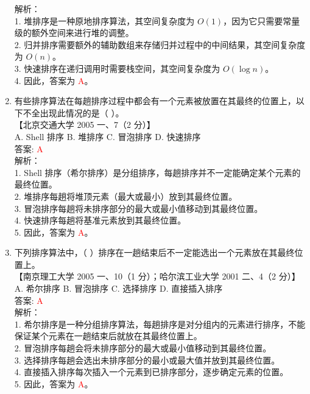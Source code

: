 \documentclass[lang=cn,newtx,10pt,scheme=chinese]{../../../elegantbook}
\begin{document}
\begin{enumerate}
    解析：\\
    1. 堆排序是一种原地排序算法，其空间复杂度为 $O(1)$，因为它只需要常量级的额外空间来进行堆的调整。\\
    2. 归并排序需要额外的辅助数组来存储归并过程中的中间结果，其空间复杂度为 $O(n)$。\\
    3. 快速排序在递归调用时需要栈空间，其空间复杂度为 $O(\log n)$。\\
    4. 因此，答案为 \textcolor{red}{A}。\\

    \item 有些排序算法在每趟排序过程中都会有一个元素被放置在其最终的位置上，以下不全出现此情况的是（ ）。\\
    【北京交通大学 2005 一、7（2 分）】\\  

    A. Shell 排序 \quad B. 堆排序 \quad C. 冒泡排序 \quad D. 快速排序 \\

    答案: \textcolor{red}{A} \\

    解析：\\
    1. Shell 排序（希尔排序）是分组排序，每趟排序并不一定能确定某个元素的最终位置。\\
    2. 堆排序每趟将堆顶元素（最大或最小）放到其最终位置。\\
    3. 冒泡排序每趟将未排序部分的最大或最小值移动到其最终位置。\\
    4. 快速排序每趟将基准元素放到其最终位置。\\
    5. 因此，答案为 \textcolor{red}{A}。\\ 

    \item 下列排序算法中，（ ）排序在一趟结束后不一定能选出一个元素放在其最终位置上。\\
    【南京理工大学 2005 一、10（1 分）；哈尔滨工业大学 2001 二、4（2 分）】\\  

    A. 希尔排序 \quad B. 冒泡排序 \quad C. 选择排序 \quad D. 直接插入排序 \\

    答案: \textcolor{red}{A} \\

    解析：\\
    1. 希尔排序是一种分组排序算法，每趟排序是对分组内的元素进行排序，不能保证某个元素在一趟结束后就放在其最终位置上。\\
    2. 冒泡排序每趟会将未排序部分的最大或最小值移动到其最终位置。\\
    3. 选择排序每趟会选出未排序部分的最小或最大值并放到其最终位置。\\
    4. 直接插入排序每次插入一个元素到已排序部分，逐步确定元素的位置。\\
    5. 因此，答案为 \textcolor{red}{A}。\\


\end{enumerate}
\end{document}
